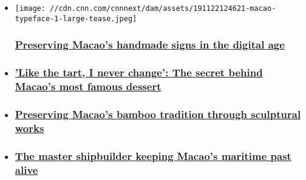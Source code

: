 \begin{itemize}
\item
  \href{/style/article/artisans-macao-typography-signs/index.html}{}

  \texttt{[image: //cdn.cnn.com/cnnnext/dam/assets/191122124621-macao-typeface-1-large-tease.jpeg]}

  \hypertarget{preserving-macaos-handmade-signs-in-the-digital-age}{%
  \subsubsection{\texorpdfstring{\href{/style/article/artisans-macao-typography-signs/index.html}{Preserving
  Macao's handmade signs in the digital
  age}}{Preserving Macao's handmade signs in the digital age}}\label{preserving-macaos-handmade-signs-in-the-digital-age}}
\item
  \hypertarget{like-the-tart-i-never-change-the-secret-behind-macaos-most-famous-dessert}{%
  \subsubsection{\texorpdfstring{\href{/travel/article/egg-tarts-margarets-cafe-e-nata-macao/index.html}{'Like
  the tart, I never change': The secret behind Macao's most famous
  dessert}}{'Like the tart, I never change': The secret behind Macao's most famous dessert}}\label{like-the-tart-i-never-change-the-secret-behind-macaos-most-famous-dessert}}
\item
  \hypertarget{preserving-macaos-bamboo-tradition-through-sculptural-works}{%
  \subsubsection{\texorpdfstring{\href{/style/article/bamboo-scaffolding-artisans-macao/index.html}{Preserving
  Macao's bamboo tradition through sculptural
  works}}{Preserving Macao's bamboo tradition through sculptural works}}\label{preserving-macaos-bamboo-tradition-through-sculptural-works}}
\item
  \hypertarget{the-master-shipbuilder-keeping-macaos-maritime-past-alive}{%
  \subsubsection{\texorpdfstring{\href{/style/article/shipbuilding-macao-artisans/index.html}{The
  master shipbuilder keeping Macao's maritime past
  alive}}{The master shipbuilder keeping Macao's maritime past alive}}\label{the-master-shipbuilder-keeping-macaos-maritime-past-alive}}
\end{itemize}

